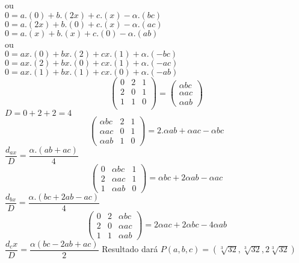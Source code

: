 \documentclass{article}
\begin{document}
\begin{itemize}
	ou\\
	$0=a.(0)+b.(2x)+c.(x)-\alpha.(bc)$\\
	$0=a.(2x)+b.(0)+c.(x)-\alpha.(ac)$\\
	$0=a.(x)+b.(x)+c.(0)-\alpha.(ab)$\\
	ou\\
	\newpage
	$0 = ax.(0) + bx.(2) + cx.(1) +\alpha.(-bc)$\\
	$0 = ax.(2)+bx.(0)+cx.(1)+\alpha.(-ac)$\\
	$0 = ax.(1)+bx.(1)+cx.(0)+\alpha.(-ab)$\\
	\begin{equation}
	\begin{pmatrix}
		0&2&1\\
		2&0&1\\
		1&1&0\\
	\end{pmatrix}
	=	
	\begin{pmatrix}
		\alpha bc\\
		\alpha ac\\
		\alpha ab
	\end{pmatrix}
	\end{equation}
	$D=0+2+2=4$\\
	\begin{equation}
	\begin{pmatrix}
		\alpha bc&2&1\\
		\alpha ac&0&1\\
		\alpha ab&1&0
	\end{pmatrix}
	=2.\alpha ab + \alpha ac- \alpha bc	
	\end{equation}
	$\dfrac{d_{ax}}{D}=\dfrac{\alpha.(ab+ac)}{4}$
	\begin{equation}
	\begin{pmatrix}
		0&\alpha bc &1\\
		2& \alpha ac &1\\
		1&\alpha ab&0
	\end{pmatrix}
	=\alpha bc+2\alpha ab - \alpha ac
	\end{equation}
	$\dfrac{d_{bx}}{D}=\dfrac{\alpha.(bc+2ab-ac)}{4}$
	\begin{equation}
	\begin{pmatrix}
		0&2&\alpha bc\\
		2&0&\alpha ac\\
		1&1&\alpha ab
	\end{pmatrix}
	=2\alpha ac+2\alpha bc -4\alpha ab	
	\end{equation}
	$\dfrac{d_cx}{D} = \dfrac{\alpha(bc-2ab+ac)}{2}$
	\newpage
	Resultado dará $P(a,b,c) = (\sqrt[3]{32},\sqrt[3]{32},2\sqrt[3]{32})$
	

\end{itemize}
\end{document}
